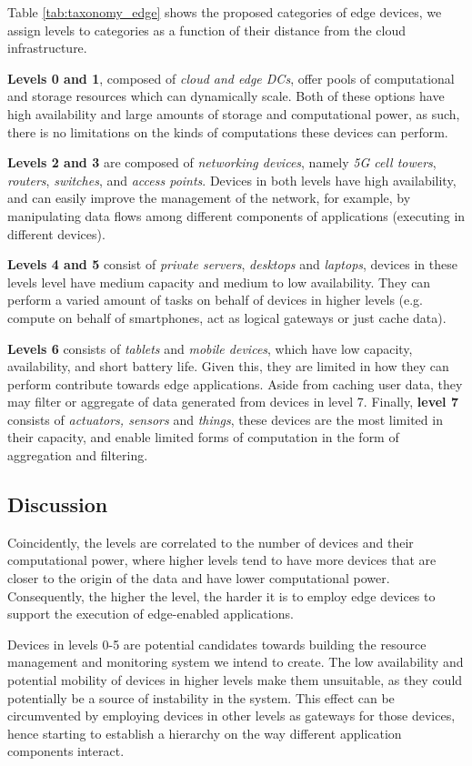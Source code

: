 Table \ref{tab:taxonomy_edge} shows the proposed categories of edge devices, we assign levels to categories as a function of their distance from the cloud infrastructure. 

\textbf{Levels 0 and 1}, composed of \textit{cloud and edge DCs}, offer pools of computational and storage resources which can dynamically scale. Both of these options have high availability and large amounts of storage and computational power, as such, there is no limitations on the kinds of computations these devices can perform.

\textbf{Levels 2 and 3} are composed of \textit{networking devices}, namely 
\textit{5G cell towers}, \textit{routers}, \textit{switches}, and \textit{access points}. Devices in both levels have high availability, and can easily improve the management of the network, for example, by manipulating data flows among different components of applications (executing in different devices).

\textbf{Levels 4 and  5} consist of \textit{private servers}, \textit{desktops} and \textit{laptops}, devices in these levels level have medium capacity and medium to low availability. They can perform a varied amount of tasks on behalf of devices in higher levels (e.g. compute on behalf of smartphones, act as logical gateways or just cache data). 

\textbf{Levels 6} consists of \textit{tablets} and \textit{mobile devices}, which have low capacity, availability, and short battery life. Given this, they are limited in how they can perform contribute towards edge applications. Aside from caching user data, they may filter or aggregate of data generated from devices in level 7. Finally, \textbf{level 7} consists of \textit{actuators, sensors} and \textit{things}, these devices are the most limited in their capacity, and enable limited forms of computation in the form of aggregation and filtering.

\subsection{Discussion}

Coincidently, the levels are correlated to the number of devices and their computational power, where higher levels tend to have more devices that are closer to the origin of the data and have lower computational power. Consequently, the higher the level, the harder it is to employ edge devices to support the execution of edge-enabled applications. 

Devices in levels 0-5 are potential candidates towards building the resource management and monitoring system we intend to create. The low availability and potential mobility of devices in higher levels make them unsuitable, as they could potentially be a source of instability in the system. This effect can be circumvented by employing devices in other levels as gateways for those devices, hence starting to establish a hierarchy on the way different application components interact.
